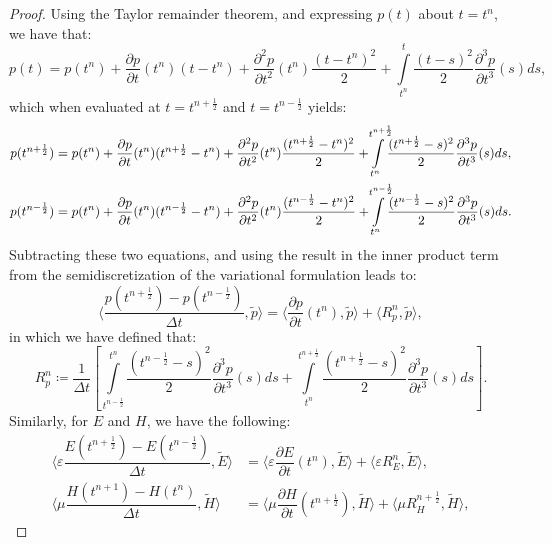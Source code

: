\documentclass{amsart}
\theoremstyle{thmstyleone}%
\theoremstyle{thmstyletwo}%
\theoremstyle{thmstylethree}%
\newcommand{\ainnerproduct}[2]{\langle #1, #2 \rangle}
\begin{document}
\begin{proof}
Using the Taylor remainder theorem, and expressing $p(t)$ about $t = t^n$, we have that:
\[
  p(t) = p(t^n) + \dfrac{\partial p}{\partial t}(t^n)(t - t^n) + \dfrac{\partial^2 p}{\partial t^2}(t^n) \dfrac{(t - t^n)^2}{2} + \int\limits_{t^n}^{t} \dfrac{(t - s)^2}{2} \dfrac{\partial^3 p}{\partial t^3}(s) ds,
\]
which when evaluated at $t = t^{n + \frac{1}{2}}$ and $t = t^{n - \frac{1}{2}}$ yields:
\begin{align*}
  p(t^{n + \frac{1}{2}}) &= p(t^n) + \dfrac{\partial p}{\partial t}(t^n) (t^{n + \frac{1}{2}} - t^n) + \dfrac{\partial^2 p}{\partial t^2}(t^n) \dfrac{(t^{n + \frac{1}{2}} - t^n)^2}{2} + \int\limits_{t^n}^{\mathclap{t^{n + \frac{1}{2}}}} \dfrac{(t^{n + \frac{1}{2}} - s)^2}{2} \dfrac{\partial^3 p}{\partial t^3}(s) ds, \\
p(t^{n - \frac{1}{2}}) &= p(t^n) + \dfrac{\partial p}{\partial t}(t^n)(t^{n - \frac{1}{2}} - t^n) + \dfrac{\partial^2 p}{\partial t^2}(t^n) \dfrac{(t^{n - \frac{1}{2}} - t^n)^2}{2} + \int\limits_{t^n}^{\mathclap{t^{n - \frac{1}{2}}}} \dfrac{(t^{n - \frac{1}{2}} - s)^2}{2} \dfrac{\partial^3 p}{\partial t^3}(s) ds.
\end{align*}
Subtracting these two equations, and using the result in the inner product term from the semidiscretization of the variational formulation leads to:
\[
  \ainnerproduct{\dfrac{p(t^{n + \frac{1}{2}}) - p(t^{n - \frac{1}{2}})}{\Delta t}}{\widetilde{p}} = \ainnerproduct{\dfrac{\partial p}{\partial t}(t^n)}{\widetilde{p}} + \ainnerproduct{R^n_p}{\widetilde{p}},
\]
in which we have defined that:
\[
  R^n_p \coloneq \dfrac{1}{\Delta t} \left[\int\limits_{t^{n - \frac{1}{2}}}^{t^n} \dfrac{(t^{n - \frac{1}{2}} - s)^2}{2} \dfrac{\partial^3 p}{\partial t^3}(s) ds + \int\limits_{t^n}^{t^{n + \frac{1}{2}}} \dfrac{(t^{n + \frac{1}{2}} - s)^2}{2} \dfrac{\partial^3 p}{\partial t^3}(s) ds \right].
\]
Similarly, for $E$ and $H$, we have the following:
\begin{align*}
  \ainnerproduct{\varepsilon \dfrac{E(t^{n + \frac{1}{2}}) - E(t^{n - \frac{1}{2}})}{\Delta t}}{\widetilde{E}} &= \ainnerproduct{\varepsilon \dfrac{\partial E}{\partial t}(t^n)}{\widetilde{E}} + \ainnerproduct{\varepsilon R^n_E}{\widetilde{E}}, \\
  \ainnerproduct{\mu \dfrac{H(t^{n + 1}) - H(t^n)}{\Delta t}}{\widetilde{H}} &= \ainnerproduct{\mu \dfrac{\partial H}{\partial t}(t^{n + \frac{1}{2}})}{\widetilde{H}} + \ainnerproduct{\mu R^{n + \frac{1}{2}}_H}{\widetilde{H}},
\end{align*}

\end{proof}
\end{document}
